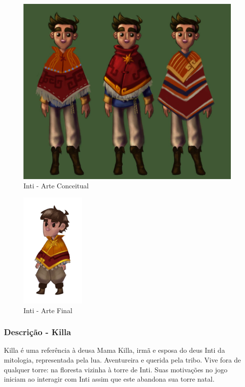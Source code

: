 \documentclass[12pt]{article}
\begin{document}
\begin{figure}[!htb]
    \centering
    \includegraphics[scale=0.15]{inti_conceitual.jpg}
    \caption{Inti - Arte Conceitual}
    \label{fig:inti_conceitual}
\end{figure}

\begin{figure}[!htb]
    \centering
    \includegraphics[scale=0.71]{inti_final.png}
    \caption{Inti - Arte Final}
    \label{fig:inti_final}
\end{figure}

\newpage

\subsubsection{Descrição - Killa}
Killa é uma referência à deusa Mama Killa, irmã e esposa do deus Inti da
mitologia, representada pela lua. Aventureira e querida pela tribo. Vive fora de
qualquer torre: na floresta vizinha à torre de Inti. Suas motivações no jogo
iniciam ao interagir com Inti assim que este abandona sua torre natal.
\end{document}
